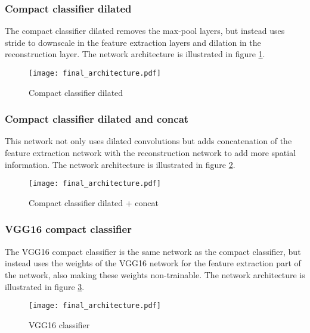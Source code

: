\subsubsection{Compact classifier dilated}
The compact classifier dilated removes the max-pool layers, but instead uses stride to downscale in the feature extraction layers and dilation in the reconstruction layer. The network architecture is illustrated in figure \ref{fig:compact_classifier_dilated}.
\begin{figure}[H]
	\centering
	\texttt{[image: final\_architecture.pdf]}
	\caption{Compact classifier dilated}
	\label{fig:compact_classifier_dilated}
\end{figure}

\subsubsection{Compact classifier dilated and concat}
This network not only uses dilated convolutions but adds concatenation of the feature extraction network with the reconstruction network to add more spatial information. The network architecture is illustrated in figure \ref{fig:compact_classifier_dilated_concat}.
\begin{figure}[H]
	\centering
	\texttt{[image: final\_architecture.pdf]}
	\caption{Compact classifier dilated + concat}
	\label{fig:compact_classifier_dilated_concat}
\end{figure}


\subsubsection{VGG16 compact classifier}
The VGG16 compact classifier is the same network as the compact classifier, but instead uses the weights of the VGG16 network for the feature extraction part of the network, also making these weights non-trainable. The network architecture is illustrated in figure \ref{fig:VGG_classifier}.
\begin{figure}[H]
	\centering
	\texttt{[image: final\_architecture.pdf]}
	\caption{VGG16 classifier}
	\label{fig:VGG_classifier}
\end{figure}







